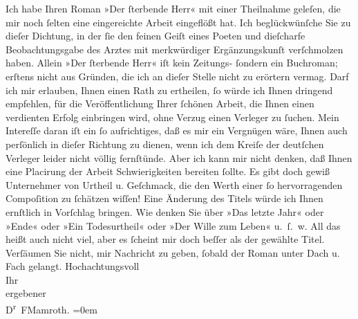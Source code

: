 \begin{ledgroupsized}[t]{13cm}
           Ich habe Ihren Roman »Der ſterbende Herr« mit
               einer Theilnahme geleſen, die mir noch ſelten eine eingereichte Arbeit eingeflößt
               hat. Ich beglückwünſche Sie zu dieſer Dichtung, in der ſie den feinen
               Geiſt eines Poeten und \introOben{}die\introOben{}{ }ſcharfe Beobachtungsgabe des Arztes mit
               merkwürdiger Ergänzungskunſt verſchmolzen haben. Allein »Der ſterbende Herr« iſt kein Zeitungs- ſondern ein Buchroman;
               erſtens nicht aus Gründen, die ich an dieſer Stelle nicht zu erörtern vermag. Darf
               ich mir erlauben, Ihnen einen Rath zu ertheilen, ſo würde ich Ihnen dringend
               empfehlen, für die Veröffentlichung Ihrer ſchönen Arbeit, die Ihnen einen verdienten
               Erfolg einbringen wird, ohne Verzug einen Verleger zu ſuchen. Mein Intereſſe daran
               iſt ein ſo aufrichtiges, daß es mir ein Vergnügen wäre, Ihnen auch perſönlich in
               dieſer Richtung zu dienen, wenn ich dem Kreiſe der deutſchen Verleger leider nicht
               völlig fernſtünde. Aber ich kann mir nicht denken, daß Ihnen eine Placirung der
               Arbeit Schwierigkeiten bereiten ſollte. Es gibt doch gewiß Unternehmer von Urtheil u.
               Geſchmack, die den Werth einer ſo hervorragenden Compoſition zu ſchätzen wiſſen! Eine
               Änderung des Titels würde ich Ihnen ernſtlich {\pb}in Vorſchlag bringen. Wie denken Sie über
               »Das letzte Jahr« oder »Ende« oder »Ein Todesurtheil« oder »Der Wille zum Leben«
               u. ſ. w. All das heißt auch nicht viel, aber es ſcheint mir doch beſſer als der
               gewählte Titel.\pend
           \pstart
           Verſäumen Sie nicht, mir Nachricht zu geben, ſobald der Roman unter Dach u. Fach gelangt.\pend
           \pstart
           Hochachtungsvoll{\\[\baselineskip]}Ihr{\\[\baselineskip]}ergebener{\\[\baselineskip]}\spacefill\mbox{D\textsuperscript{r} FMamroth.}\pend
           \leftskip=0em{}
         
         \endnumbering{}\end{ledgroupsized}  \newcommand{\dateiname}{L00216}\newcommand{\titel}{Fedor Mamroth an Arthur Schnitzler, 4. 6. 1893}\newcommand{\editorInnen}{Martin Anton Müller und Gerd-Hermann Susen}
      